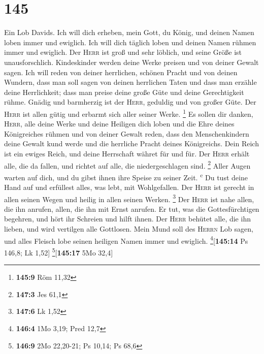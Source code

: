 \hypertarget{section-144}{%
\section{145}\label{section-144}}

 Ein Lob Davids. Ich will dich erheben, mein Gott, du
König, und deinen Namen loben immer und ewiglich.  Ich
will dich täglich loben und deinen Namen rühmen immer und ewiglich.
 Der \textsc{Herr} ist groß und sehr löblich, und seine
Größe ist unausforschlich.  Kindeskinder werden deine
Werke preisen und von deiner Gewalt sagen.  Ich will reden
von deiner herrlichen, schönen Pracht und von deinen Wundern,
 dass man soll sagen von deinen herrlichen Taten und dass
man erzähle deine Herrlichkeit;  dass man preise deine
große Güte und deine Gerechtigkeit rühme.  Gnädig und
barmherzig ist der \textsc{Herr}, geduldig und von großer Güte.
 Der \textsc{Herr} ist allen gütig und erbarmt sich aller
seiner Werke. \footnote{\textbf{145:9} Röm 11,32}  Es
sollen dir danken, \textsc{Herr}, alle deine Werke und deine Heiligen
dich loben  und die Ehre deines Königreiches rühmen und
von deiner Gewalt reden,  dass den Menschenkindern deine
Gewalt kund werde und die herrliche Pracht deines Königreichs.
 Dein Reich ist ein ewiges Reich, und deine Herrschaft
währet für und für.  Der \textsc{Herr} erhält alle, die
da fallen, und richtet auf alle, die niedergeschlagen sind. \footnote{\textbf{147:3}
  Jes 61,1}  Aller Augen warten auf dich, und du gibst
ihnen ihre Speise zu seiner Zeit. \textsuperscript{c}  Du
tust deine Hand auf und erfüllest alles, was lebt, mit Wohlgefallen.
 Der \textsc{Herr} ist gerecht in allen seinen Wegen und
heilig in allen seinen Werken. \footnote{\textbf{147:6} Lk 1,52}
 Der \textsc{Herr} ist nahe allen, die ihn anrufen,
allen, die ihn mit Ernst anrufen.  Er tut, was die
Gottesfürchtigen begehren, und hört ihr Schreien und hilft ihnen.
 Der \textsc{Herr} behütet alle, die ihn lieben, und wird
vertilgen alle Gottlosen.  Mein Mund soll des
\textsc{Herrn} Lob sagen, und alles Fleisch lobe seinen heiligen Namen
immer und ewiglich. \footnote{\textbf{146:4} 1Mo 3,19; Pred 12,7}{[}\textbf{145:14}
Ps 146,8; Lk 1,52{]} \footnote{\textbf{146:9} 2Mo 22,20-21; Ps 10,14; Ps
  68,6}{[}\textbf{145:17} 5Mo 32,4{]}

